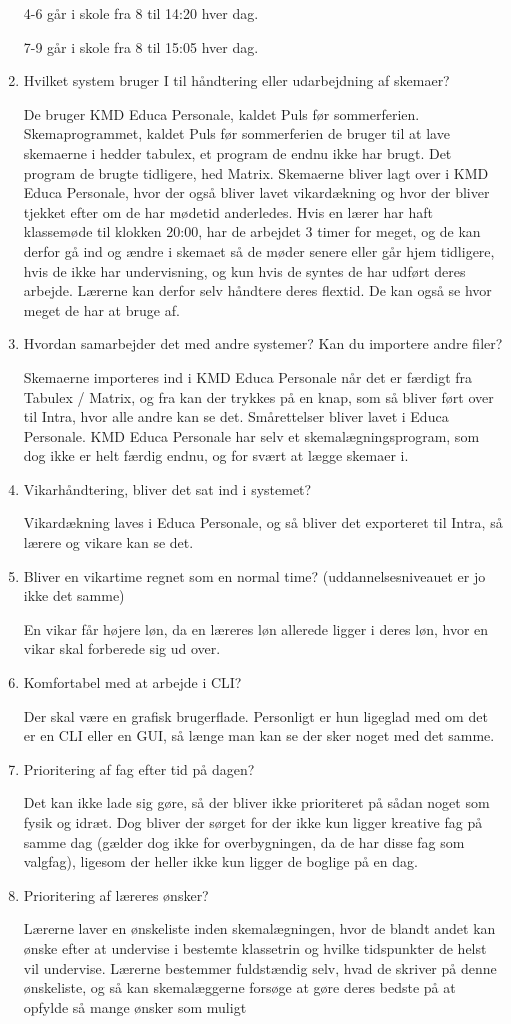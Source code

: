 \begin{enumerate}
	4-6 går i skole fra 8 til 14:20 hver dag.
	
	7-9 går i skole fra 8 til 15:05 hver dag.
	\item Hvilket system bruger I til håndtering eller udarbejdning af skemaer?
	
	De bruger KMD Educa Personale, kaldet Puls før sommerferien. Skemaprogrammet, kaldet Puls før sommerferien de bruger til at lave skemaerne i hedder tabulex, et program de endnu ikke har brugt. Det program de brugte tidligere, hed Matrix.
	Skemaerne bliver lagt over i KMD Educa Personale, hvor der også bliver lavet vikardækning og hvor der bliver tjekket efter om de har mødetid anderledes. Hvis en lærer har haft klassemøde til klokken 20:00, har de arbejdet 3 timer for meget, og de kan derfor gå ind og ændre i skemaet så de møder senere eller går hjem tidligere, hvis de ikke har undervisning, og kun hvis de syntes de har udført deres arbejde. Lærerne kan derfor selv håndtere deres flextid. De kan også se hvor meget de har at bruge af.
	\item Hvordan samarbejder det med andre systemer? Kan du importere andre filer?
	
	Skemaerne importeres ind i KMD Educa Personale når det er færdigt fra Tabulex / Matrix, og fra kan der trykkes på en knap, som så bliver ført over til Intra, hvor alle andre kan se det. Smårettelser bliver lavet i Educa Personale.
	KMD Educa Personale har selv et skemalægningsprogram, som dog ikke er helt færdig endnu, og for svært at lægge skemaer i.
	\item Vikarhåndtering, bliver det sat ind i systemet?
	
	Vikardækning laves i Educa Personale, og så bliver det exporteret til Intra, så lærere og vikare kan se det.
	\item Bliver en vikartime regnet som en normal time? (uddannelsesniveauet er jo ikke det samme)
	
	En vikar får højere løn, da en læreres løn allerede ligger i deres løn, hvor en vikar skal forberede sig ud over.
	\item Komfortabel med at arbejde i CLI?
	
	Der skal være en grafisk brugerflade. Personligt er hun ligeglad med om det er en CLI eller en GUI, så længe man kan se der sker noget med det samme.
	\item Prioritering af fag efter tid på dagen?
	
	Det kan ikke lade sig gøre, så der bliver ikke prioriteret på sådan noget som fysik og idræt.
	Dog bliver der sørget for der ikke kun ligger kreative fag på samme dag (gælder dog ikke for overbygningen, da de har disse fag som valgfag), ligesom der heller ikke kun ligger de boglige på en dag.
	\item Prioritering af læreres ønsker?
	
	Lærerne laver en ønskeliste inden skemalægningen, hvor de blandt andet kan ønske efter at undervise i bestemte klassetrin og hvilke tidspunkter de helst vil undervise. Lærerne bestemmer fuldstændig selv, hvad de skriver på denne ønskeliste, og så kan skemalæggerne forsøge at gøre deres bedste på at opfylde så mange ønsker som muligt
\end{enumerate}